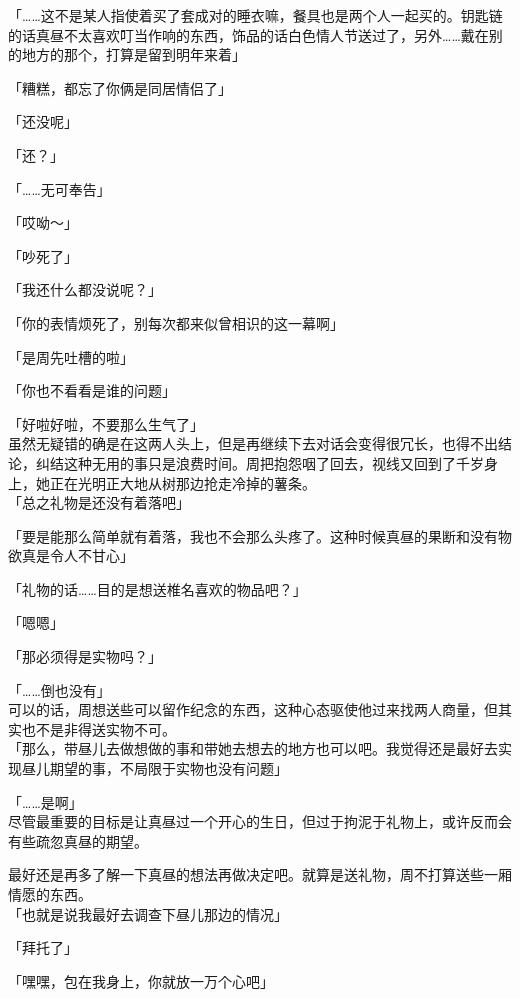 「……这不是某人指使着买了套成对的睡衣嘛，餐具也是两个人一起买的。钥匙链的话真昼不太喜欢叮当作响的东西，饰品的话白色情人节送过了，另外……戴在别的地方的那个，打算是留到明年来着」

「糟糕，都忘了你俩是同居情侣了」

「还没呢」

「还？」

「……无可奉告」

「哎呦～」

「吵死了」

「我还什么都没说呢？」

「你的表情烦死了，别每次都来似曾相识的这一幕啊」

「是周先吐槽的啦」

「你也不看看是谁的问题」

「好啦好啦，不要那么生气了」\\

虽然无疑错的确是在这两人头上，但是再继续下去对话会变得很冗长，也得不出结论，纠结这种无用的事只是浪费时间。周把抱怨咽了回去，视线又回到了千岁身上，她正在光明正大地从树那边抢走冷掉的薯条。\\

「总之礼物是还没有着落吧」

「要是能那么简单就有着落，我也不会那么头疼了。这种时候真昼的果断和没有物欲真是令人不甘心」

「礼物的话……目的是想送椎名喜欢的物品吧？」

「嗯嗯」

「那必须得是实物吗？」

「……倒也没有」\\

可以的话，周想送些可以留作纪念的东西，这种心态驱使他过来找两人商量，但其实也不是非得送实物不可。\\

「那么，带昼儿去做想做的事和带她去想去的地方也可以吧。我觉得还是最好去实现昼儿期望的事，不局限于实物也没有问题」

「……是啊」\\

尽管最重要的目标是让真昼过一个开心的生日，但过于拘泥于礼物上，或许反而会有些疏忽真昼的期望。

最好还是再多了解一下真昼的想法再做决定吧。就算是送礼物，周不打算送些一厢情愿的东西。\\

「也就是说我最好去调查下昼儿那边的情况」

「拜托了」

「嘿嘿，包在我身上，你就放一万个心吧」

